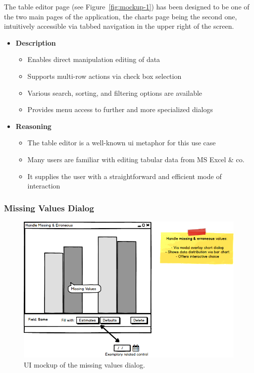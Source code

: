 The table editor page (see Figure~\ref{fig:mockup-1}) has been designed to be one of the two main pages of the application, the charts page being the second one, intuitively accessible via tabbed navigation in the upper right of the screen.

\begin{itemize}
  \item \textbf{Description}
  \begin{itemize}
    \item Enables direct manipulation editing of data
    \item Supports multi-row actions via check box selection
    \item Various search, sorting, and filtering options are available
    \item Provides menu access to further and more specialized dialogs
  \end{itemize}
  \item \textbf{Reasoning}
  \begin{itemize}
    \item The table editor is a well-known \gls{ui} metaphor for this use case
    \item Many users are familiar with editing tabular data from MS Excel \& co.
    \item It supplies the user with a straightforward and efficient mode of interaction
  \end{itemize}
\end{itemize}


\subsubsection{Missing Values Dialog}

\begin{figure}[h]
  \centering
  \includegraphics[width=1.12\textwidth]{figures/design/mockup-2}
  \caption{UI mockup of the missing values dialog.}
  \label{fig:mockup-2}
\end{figure}

